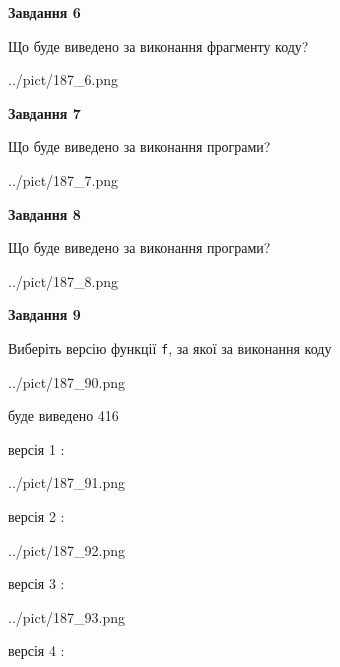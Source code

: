 \documentclass[12pt, ukrainian]{article}
\def\code#1{\Verb!#1!}
\begin{document}
{\begin {large}
{\begin {center}\textbf{Завдання 6}\end {center}}

Що буде виведено за виконання фрагменту коду?\par
\begin{center}
	{../pict/187_6.png}
\end{center}
\newpage

{\begin {center}\textbf{Завдання 7}\end {center}}

Що буде виведено за виконання програми?\par
\begin{center}
	{../pict/187_7.png}
\end{center}
\newpage

{\begin {center}\textbf{Завдання 8}\end {center}}

Що буде виведено за виконання програми?\par
\begin{center}
	{../pict/187_8.png}
\end{center}
\newpage

{\begin {center}\textbf{Завдання 9}\end {center}}

Виберіть версію функції \code{f}, за якої за виконання коду
\begin{center}
	{../pict/187_90.png}
\end{center}
буде виведено 416

\vspace{5mm}
версія 1 :

\begin{center}
	{../pict/187_91.png}
\end{center}
версія 2 :

\begin{center}
	{../pict/187_92.png}
\end{center}
версія 3 :

\begin{center}
	{../pict/187_93.png}
\end{center}
версія 4 :


\end{large}}
\end{document}
